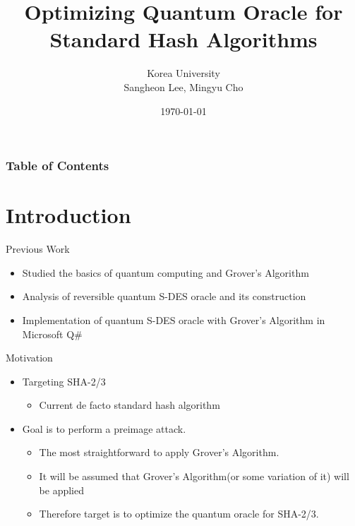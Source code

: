 \documentclass{beamer}
\title{Optimizing Quantum Oracle for Standard Hash Algorithms}
\author{Korea University\\Sangheon Lee, Mingyu Cho}
\date{\today}
\begin{document}
    \begin{frame}
        \titlepage
    \end{frame}

    \begin{frame}
        \frametitle{Table of Contents}
        \tableofcontents
    \end{frame}
    
    \section{Introduction}
    \begin{frame}{Previous Work}
        \begin{itemize}
            \item Studied the basics of quantum computing and Grover's Algorithm
            \item Analysis of reversible quantum S-DES oracle and its construction
            \item Implementation of quantum S-DES oracle with Grover's Algorithm in Microsoft Q\#
        \end{itemize}
    \end{frame}
    
    \begin{frame}{Motivation}
        \begin{itemize}
          \item Targeting SHA-2/3
          \begin{itemize}
            \item Current de facto standard hash algorithm
          \end{itemize}
          \item Goal is to perform a preimage attack.
          \begin{itemize}
            \item The most straightforward to apply Grover's Algorithm.
            \item It will be assumed that Grover's Algorithm(or some variation of it) will be applied
            \item Therefore target is to optimize the quantum oracle for SHA-2/3.
          \end{itemize}
        \end{itemize}
    \end{frame}
    
\end{document}
